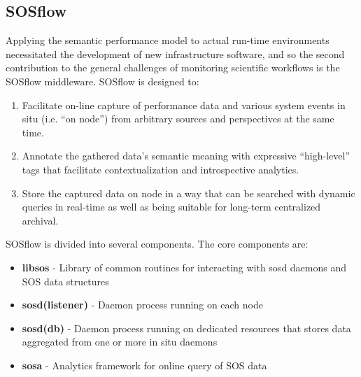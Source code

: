 
\subsection{SOSflow}
Applying the semantic performance model to actual
run-time environments necessitated the development of new
infrastructure software, and so the second contribution to the general
challenges of monitoring scientific workflows is the SOSflow middleware.
SOSflow is designed to:

\begin{enumerate}
\item Facilitate on-line capture of performance data and various system
  events in situ (i.e. ``on node'') from arbitrary sources and
  perspectives at the same time.
\item Annotate the gathered data's semantic meaning with expressive
  ``high-level'' tags that facilitate contextualization and
  introspective analytics.
\item Store the captured data on node in a way that can be searched
  with dynamic queries in real-time as well as being suitable for
  long-term centralized archival.
\end{enumerate}

SOSflow is divided into several components.  The core components are:
\begin{itemize}
\item \textbf{libsos} - Library of common routines for interacting with
      sosd daemons and SOS data structures
\item \textbf{sosd(listener)} - Daemon process running on each node
\item \textbf{sosd(db)} - Daemon process running on dedicated resources
      that stores data aggregated from one or more in situ daemons
\item \textbf{sosa} - Analytics framework for online query of SOS data
\end{itemize}

